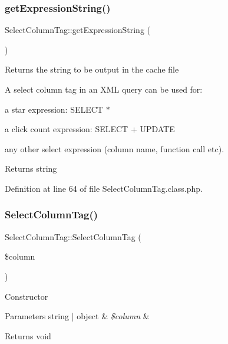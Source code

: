 \subsubsection{\texorpdfstring{get\+Expression\+String()}{getExpressionString()}}
{\footnotesize\ttfamily Select\+Column\+Tag\+::get\+Expression\+String (\begin{DoxyParamCaption}{ }\end{DoxyParamCaption})}

Returns the string to be output in the cache file

A select column tag in an X\+ML query can be used for\+: 
\begin{DoxyItemize}
\item a star expression\+: S\+E\+L\+E\+CT $\ast$ 
\item a click count expression\+: S\+E\+L\+E\+CT + U\+P\+D\+A\+TE 
\item any other select expression (column name, function call etc).  
\end{DoxyItemize}

\begin{DoxyReturn}{Returns}
string 
\end{DoxyReturn}


Definition at line 64 of file Select\+Column\+Tag.\+class.\+php.

\hypertarget{classSelectColumnTag_a05e82794cb692f0af9a7da2eb41a229d}{}\label{classSelectColumnTag_a05e82794cb692f0af9a7da2eb41a229d} 
\subsubsection{\texorpdfstring{Select\+Column\+Tag()}{SelectColumnTag()}}
{\footnotesize\ttfamily Select\+Column\+Tag\+::\+Select\+Column\+Tag (\begin{DoxyParamCaption}\item[{}]{\$column }\end{DoxyParamCaption})}

Constructor


\begin{DoxyParams}[1]{Parameters}
string | object & {\em \$column} & \\
\hline
\end{DoxyParams}
\begin{DoxyReturn}{Returns}
void 
\end{DoxyReturn}


